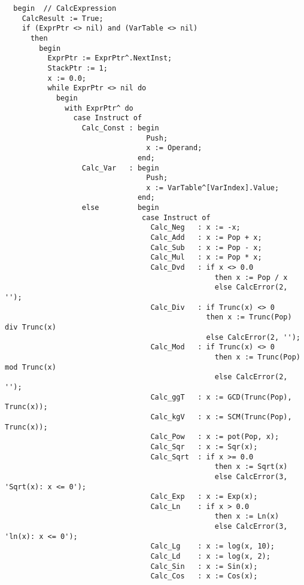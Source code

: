 \begin{refsection}
\begin{lstlisting}
  begin  // CalcExpression
    CalcResult := True;
    if (ExprPtr <> nil) and (VarTable <> nil)
      then
        begin
          ExprPtr := ExprPtr^.NextInst;
          StackPtr := 1;
          x := 0.0;
          while ExprPtr <> nil do
            begin
              with ExprPtr^ do
                case Instruct of
                  Calc_Const : begin
                                 Push;
                                 x := Operand;
                               end;
                  Calc_Var   : begin
                                 Push;
                                 x := VarTable^[VarIndex].Value;
                               end;
                  else         begin
                                case Instruct of
                                  Calc_Neg   : x := -x;
                                  Calc_Add   : x := Pop + x;
                                  Calc_Sub   : x := Pop - x;
                                  Calc_Mul   : x := Pop * x;
                                  Calc_Dvd   : if x <> 0.0
                                                 then x := Pop / x
                                                 else CalcError(2, '');
                                  Calc_Div   : if Trunc(x) <> 0
                                               then x := Trunc(Pop) div Trunc(x)
                                               else CalcError(2, '');
                                  Calc_Mod   : if Trunc(x) <> 0
                                                 then x := Trunc(Pop) mod Trunc(x)
                                                 else CalcError(2, '');
                                  Calc_ggT   : x := GCD(Trunc(Pop), Trunc(x));
                                  Calc_kgV   : x := SCM(Trunc(Pop), Trunc(x));
                                  Calc_Pow   : x := pot(Pop, x);
                                  Calc_Sqr   : x := Sqr(x);
                                  Calc_Sqrt  : if x >= 0.0
                                                 then x := Sqrt(x)
                                                 else CalcError(3, 'Sqrt(x): x <= 0');
                                  Calc_Exp   : x := Exp(x);
                                  Calc_Ln    : if x > 0.0
                                                 then x := Ln(x)
                                                 else CalcError(3, 'ln(x): x <= 0');
                                  Calc_Lg    : x := log(x, 10);
                                  Calc_Ld    : x := log(x, 2);
                                  Calc_Sin   : x := Sin(x);
                                  Calc_Cos   : x := Cos(x);

\end{lstlisting}
\end{refsection}

